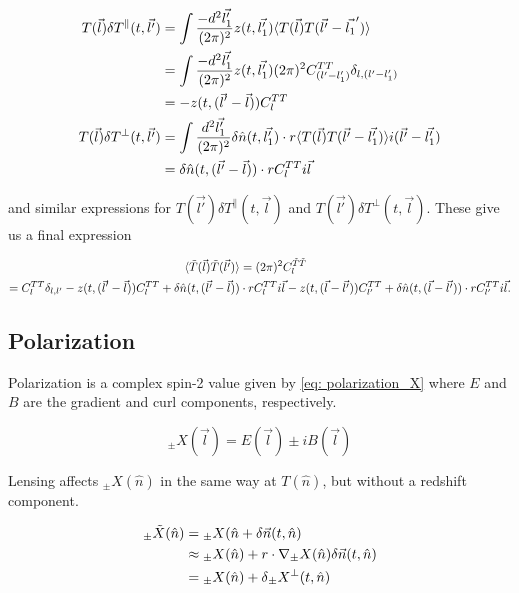 \documentclass{article}
\begin{document}
\begin{align}
    T(\vec{l})\delta T^\parallel(t,\vec{l'}) &= \int \frac{-d^2\vec{l_1'}}{(2\pi)^2}z(t,\vec{l_1'})\langle T(\vec{l}) T(\vec{l'} -\vec{l_1}')\rangle \notag \\
    &= \int \frac{-d^2\vec{l_1'}}{(2\pi)^2}z(t,\vec{l_1'})(2\pi)^2 C^{TT}_{(l'-l_1')} \delta_{l,(l'-l_1')} \notag \\
    &= -z(t,(\vec{l}'-\vec{l}))C^{TT}_l \notag \\ 
    T(\vec{l})\delta T^\perp(t,\vec{l'}) &= \int \frac{d^2\vec{l_1'}}{(2\pi)^2} \delta\hat{n}(t,\vec{l_1'}) \cdot r\langle T(\vec{l})T(\vec{l'} - \vec{l_1'})\rangle i(\vec{l'} - \vec{l_1'}) \notag \\
    &= \delta\hat{n}(t,(\vec{l'}-\vec{l}))\cdot rC^{TT}_li\vec{l}
\end{align}

and similar expressions for $T(\vec{l'})\delta T^\parallel(t,\vec{l})$ and $T(\vec{l'})\delta T^\perp(t,\vec{l})$. These give us a final expression 


\begin{align}
    \langle \Tilde{T}(\vec{l}) \Tilde{T}(\vec{l'})\rangle &= (2\pi)^2 C^{\Tilde{T}\Tilde{T}}_l \notag \\
    = C^{TT}_l\delta_{l,l'} - z(t,(\vec{l}'-\vec{l}))C^{TT}_l + \delta\hat{n}(t,(\vec{l'}-\vec{l}))&\cdot rC^{TT}_li\vec{l} - z(t,(\vec{l}-\vec{l'}))C^{TT}_{l'} + \delta\hat{n}(t,(\vec{l}-\vec{l'}))\cdot rC^{TT}_{l'}i\vec{l}. \notag %
\end{align}

\subsection{Polarization}

Polarization is a complex spin-2 value given by \ref{eq: polarization_X} where $E$ and $B$ are the gradient and curl components, respectively. 

\begin{equation}
    {}_{\pm}X(\vec{l}) = E(\vec{l}) \pm iB(\vec{l}) 
    \label{eq: polarization_X}
\end{equation}

Lensing affects ${}_{\pm}X(\hat{n})$ in the same way at $T(\hat{n})$, but without a redshift component. 

\begin{align}
    {}_{\pm}\Tilde{X}(\hat{n}) &= {}_{\pm}X(\hat{n} + \delta\vec{n}(t,\hat{n}) \notag \\
    &\approx {}_{\pm}X(\hat{n}) + r\cdot\nabla {}_{\pm}{X}(\hat{n})\delta\vec{n}(t,\hat{n}) \notag \\
    &= {}_{\pm}X(\hat{n}) + \delta{}_{\pm}X^\perp(t, \hat{n}) \label{eq: X approx}
\end{align}
\end{document}
